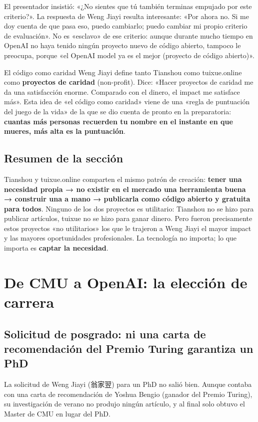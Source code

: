 \documentclass[a4paper]{article}
\begin{document}
El presentador insistió: «¿No sientes que tú también terminas empujado por este criterio?». La respuesta de Weng Jiayi resulta interesante: «Por ahora no. Si me doy cuenta de que pasa eso, puedo cambiarlo; puedo cambiar mi propio criterio de evaluación». No es «esclavo» de ese criterio: aunque durante mucho tiempo en OpenAI no haya tenido ningún proyecto nuevo de código abierto, tampoco le preocupa, porque «el OpenAI model ya es el mejor (proyecto de código abierto)».

\begin{importantbox}{El código como caridad}
Weng Jiayi define tanto Tianshou como tuixue.online como \textbf{proyectos de caridad} (non-profit). Dice: «Hacer proyectos de caridad me da una satisfacción enorme. Comparado con el dinero, el impact me satisface más». Esta idea de «el código como caridad» viene de una «regla de puntuación del juego de la vida» de la que se dio cuenta de pronto en la preparatoria: \textbf{cuantas más personas recuerden tu nombre en el instante en que mueres, más alta es la puntuación}.
\end{importantbox}

\subsection{Resumen de la sección}

Tianshou y tuixue.online comparten el mismo patrón de creación: \textbf{tener una necesidad propia → no existir en el mercado una herramienta buena → construir una a mano → publicarla como código abierto y gratuita para todos}. Ninguno de los dos proyectos es utilitario: Tianshou no se hizo para publicar artículos, tuixue no se hizo para ganar dinero. Pero fueron precisamente estos proyectos «no utilitarios» los que le trajeron a Weng Jiayi el mayor impact y las mayores oportunidades profesionales. La tecnología no importa; lo que importa es \textbf{captar la necesidad}.

\section{De CMU a OpenAI: la elección de carrera}

\subsection{Solicitud de posgrado: ni una carta de recomendación del Premio Turing garantiza un PhD}

La solicitud de Weng Jiayi (翁家翌) para un PhD no salió bien. Aunque contaba con una carta de recomendación de Yoshua Bengio (ganador del Premio Turing), su investigación de verano no produjo ningún artículo, y al final solo obtuvo el Master de CMU en lugar del PhD.
\end{document}
